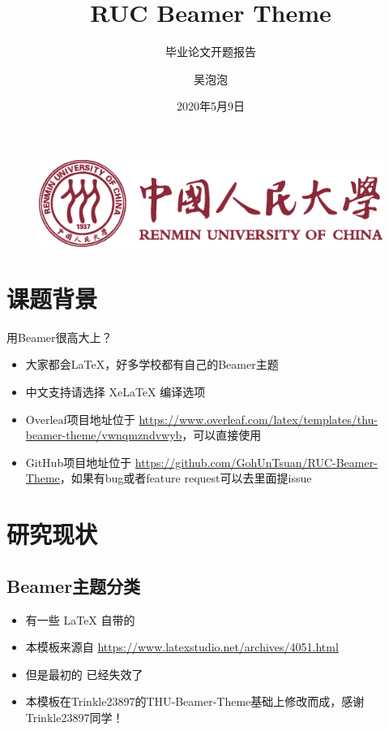 \documentclass{ctexbeamer}
\author{吴泡泡}
\title{RUC Beamer Theme}
\subtitle{毕业论文开题报告}
\institute{中国人民大学国际关系学院}
\date{2020年5月9日}
\begin{document}
\begin{frame}
  \titlepage
  \begin{figure}[htpb]
    \begin{center}
      \includegraphics[width=0.4\linewidth]{RucBeamerAssets/Renmin_Univ_Logo.eps}
    \end{center}
  \end{figure}
\end{frame}

\begin{frame}
  \tableofcontents[sectionstyle=show,subsectionstyle=show/shaded/hide,subsubsectionstyle=show/shaded/hide]
\end{frame}

\section{课题背景}

\begin{frame}{用Beamer很高大上？}
  \begin{itemize}[<+-| alert@+>] %
    \item 大家都会\LaTeX{}，好多学校都有自己的Beamer主题
    \item 中文支持请选择 Xe\LaTeX{} 编译选项
    \item Overleaf项目地址位于 \url{https://www.overleaf.com/latex/templates/thu-beamer-theme/vwnqmzndvwyb}，可以直接使用
    \item GitHub项目地址位于 \url{https://github.com/GohUnTsuan/RUC-Beamer-Theme}，如果有bug或者feature request可以去里面提issue
  \end{itemize}
\end{frame}

\section{研究现状}

\subsection{Beamer主题分类}

\begin{frame}
  \begin{itemize}
    \item 有一些 \LaTeX{} 自带的
    \item 本模板来源自 \newline \url{https://www.latexstudio.net/archives/4051.html}
    \item 但是最初的 \href{http://far.tooold.cn/post/latex/beamertsinghua}{\color{purple}{link}} \cite{origin}已经失效了
    \item 本模板在Trinkle23897的THU-Beamer-Theme基础上修改而成，感谢Trinkle23897同学！\href{https://github.com/Trinkle23897/THU-Beamer-Theme}{\color{red}{戳我}}
  \end{itemize}
\end{frame}
\end{document}
